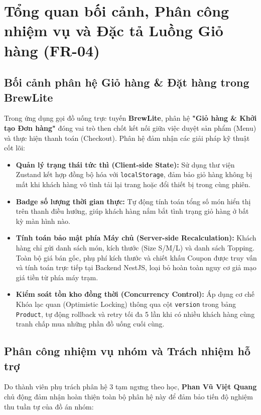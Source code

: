 \documentclass[a4paper]{article}
\begin{document}
\thispagestyle{empty}
\newpage
\tableofcontents
\newpage

\section{Tổng quan bối cảnh, Phân công nhiệm vụ và Đặc tả Luồng Giỏ hàng (FR-04)}

\subsection{Bối cảnh phân hệ Giỏ hàng \& Đặt hàng trong BrewLite}
Trong ứng dụng gọi đồ uống trực tuyến \textbf{BrewLite}, phân hệ \textbf{"Giỏ hàng \& Khởi tạo Đơn hàng"} đóng vai trò then chốt kết nối giữa việc duyệt sản phẩm (Menu) và thực hiện thanh toán (Checkout). Phân hệ đảm nhận các giải pháp kỹ thuật cốt lõi:
\begin{itemize}
    \item \textbf{Quản lý trạng thái tức thì (Client-side State):} Sử dụng thư viện Zustand kết hợp đồng bộ hóa với \texttt{localStorage}, đảm bảo giỏ hàng không bị mất khi khách hàng vô tình tải lại trang hoặc đổi thiết bị trong cùng phiên.
    \item \textbf{Badge số lượng thời gian thực:} Tự động tính toán tổng số món hiển thị trên thanh điều hướng, giúp khách hàng nắm bắt tình trạng giỏ hàng ở bất kỳ màn hình nào.
    \item \textbf{Tính toán bảo mật phía Máy chủ (Server-side Recalculation):} Khách hàng chỉ gửi danh sách món, kích thước (Size S/M/L) và danh sách Topping. Toàn bộ giá bán gốc, phụ phí kích thước và chiết khấu Coupon được truy vấn và tính toán trực tiếp tại Backend NestJS, loại bỏ hoàn toàn nguy cơ giả mạo giá tiền từ phía máy trạm.
    \item \textbf{Kiểm soát tồn kho đồng thời (Concurrency Control):} Áp dụng cơ chế Khóa lạc quan (Optimistic Locking) thông qua cột \texttt{version} trong bảng \texttt{Product}, tự động rollback và retry tối đa 5 lần khi có nhiều khách hàng cùng tranh chấp mua những phần đồ uống cuối cùng.
\end{itemize}

\subsection{Phân công nhiệm vụ nhóm và Trách nhiệm hỗ trợ}
Do thành viên phụ trách phân hệ 3 tạm ngưng theo học, \textbf{Phan Vũ Việt Quang} chủ động đảm nhận hoàn thiện toàn bộ phân hệ này để đảm bảo tiến độ nghiệm thu tuần tự của đồ án nhóm:
\end{document}
